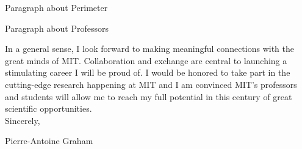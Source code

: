 \documentclass[12pt]{article}
\begin{document}
Paragraph about Perimeter

Paragraph about Professors

In a general sense, I look forward to making meaningful connections with the great minds of MIT. Collaboration and exchange are central to launching a stimulating career I will be proud of. I would be honored to take part in the cutting-edge research happening at MIT and I am convinced MIT's professors and students will allow me to reach my full potential in this century of great scientific opportunities.\\

Sincerely,

Pierre-Antoine Graham
\end{document}
